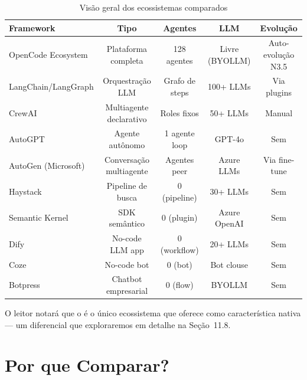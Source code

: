 \begin{table}[htb]
\centering
\caption{Visão geral dos ecossistemas comparados}
\label{tab:visao-geral}
\begin{tabular}{lcccc}
\toprule
\textbf{Framework} & \textbf{Tipo} & \textbf{Agentes} & \textbf{LLM} & \textbf{Evolução} \\
\midrule
OpenCode Ecosystem & Plataforma completa & 128 agentes & Livre (BYOLLM) & Auto-evolução N3.5 \\
LangChain/LangGraph & Orquestração LLM & Grafo de steps & 100+ LLMs & Via plugins \\
CrewAI & Multiagente declarativo & Roles fixos & 50+ LLMs & Manual \\
AutoGPT & Agente autônomo & 1 agente loop & GPT-4o & Sem \\
AutoGen (Microsoft) & Conversação multiagente & Agentes peer & Azure LLMs & Via fine-tune \\
Haystack & Pipeline de busca & 0 (pipeline) & 30+ LLMs & Sem \\
Semantic Kernel & SDK semântico & 0 (plugin) & Azure OpenAI & Sem \\
Dify & No-code LLM app & 0 (workflow) & 20+ LLMs & Sem \\
Coze & No-code bot & 0 (bot) & Bot clouse & Sem \\
Botpress & Chatbot empresarial & 0 (flow) & BYOLLM & Sem \\
\bottomrule
\end{tabular}
\end{table}
\noindent O leitor notará que o \opencodeeco{} é o único ecossistema que
oferece  como característica nativa --- um
diferencial que exploraremos em detalhe na Seção~11.8.
\section{Por que Comparar?}
\label{sec:por-que-comparar}
\nivelzero
